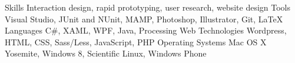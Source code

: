   \begin{cvskills}
  	\cvskill
		{Skills}
		{Interaction design, rapid prototyping, user research, website design}
	\cvskill
		{Tools}
		{Visual Studio, JUnit and NUnit, MAMP, Photoshop, Illustrator, Git, LaTeX}
    \cvskill
      {Languages}
      {C\#, XAML, WPF, Java, Processing}
  	\cvskill
		{Web Technologies}
		{Wordpress, HTML, CSS, Sass/Less, JavaScript, PHP}
  	\cvskill
		{Operating Systems}
		{Mac OS X Yosemite, Windows 8, Scientific Linux, Windows Phone}
  \end{cvskills}
